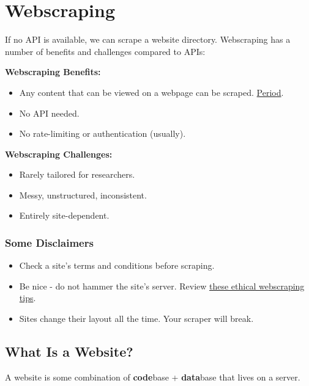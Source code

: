 \documentclass[]{book}
\providecommand{\tightlist}{%
  \setlength{\itemsep}{0pt}\setlength{\parskip}{0pt}}
\begin{document}
\hypertarget{webscraping}{\section{Webscraping}\label{webscraping}}

If no API is available, we can scrape a website directory. Webscraping
has a number of benefits and challenges compared to APIs:

\textbf{Webscraping Benefits:}

\begin{itemize}
\tightlist
\item
  Any content that can be viewed on a webpage can be scraped.
  \href{https://blog.hartleybrody.com/web-scraping/}{Period}.
\item
  No API needed.
\item
  No rate-limiting or authentication (usually).
\end{itemize}

\textbf{Webscraping Challenges:}

\begin{itemize}
\tightlist
\item
  Rarely tailored for researchers.
\item
  Messy, unstructured, inconsistent.
\item
  Entirely site-dependent.
\end{itemize}

\subsubsection{Some Disclaimers}\label{some-disclaimers}

\begin{itemize}
\tightlist
\item
  Check a site's terms and conditions before scraping.
\item
  Be nice - do not hammer the site's server. Review
  \href{https://towardsdatascience.com/ethics-in-web-scraping-b96b18136f01}{these
  ethical webscraping tips}.
\item
  Sites change their layout all the time. Your scraper will break.
\end{itemize}

\subsection{What Is a Website?}\label{what-is-a-website}

A website is some combination of \textbf{code}base + \textbf{data}base
that lives on a server.
\end{document}

